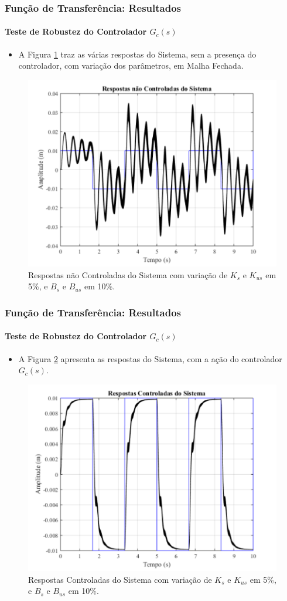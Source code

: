 \documentclass{beamer}
\begin{document}
\begin{frame}
\frametitle{Função de Transferência: Resultados}
\framesubtitle{Teste de Robustez do Controlador $G_c(s)$}
\begin{itemize}
\item A Figura \ref{sistemaIntervalar2} traz as várias respostas do Sistema, sem a presença do controlador, com variação dos parâmetros, em Malha Fechada.
\end{itemize}
\begin{figure}[H]
  \centering
\includegraphics[width=.5\columnwidth]{./imagens/resposta_sistema_variando_Ks_Kus_5_Bs_Bus_10.pdf}
    \renewcommand{\figurename}{Fig. 12}
    \caption{Respostas não Controladas do Sistema com variação de $K_s$ e $K_{us}$ em 5\%, e $B_s$ e $B_{us}$ em 10\%.}
  \label{sistemaIntervalar2}
\end{figure}
\end{frame}

\begin{frame}
\frametitle{Função de Transferência: Resultados}
\framesubtitle{Teste de Robustez do Controlador $G_c(s)$}
\begin{itemize}
\item A Figura \ref{controladaIntervalar2} apresenta as respostas do Sistema, com a ação do controlador $G_c(s)$.
\end{itemize}
\begin{figure}[H]
  \centering
\includegraphics[width=.5\columnwidth]{./imagens/resposta_controlada_variando_Ks_Kus_5_Bs_Bus_10_controlador_sem_robustez.pdf}
    \renewcommand{\figurename}{Fig. 13}
    \caption{Respostas Controladas do Sistema com variação de $K_s$ e $K_{us}$ em 5\%, e $B_s$ e $B_{us}$ em 10\%.}
  \label{controladaIntervalar2}
\end{figure}
\end{frame}
\end{document}
